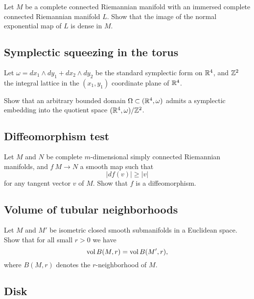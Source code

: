 \begin{pr}
Let $M$ be a complete connected Riemannian manifold
with an immersed complete connected Riemannian manifold $L$.
Show that the image  of the 
normal exponential map of $L$ is dense in $M$.
\end{pr}

\subsection*{Symplectic squeezing in the torus}
\label{Symplectic squeezing in the torus}



\begin{pr}
Let 
$\omega=dx_1\wedge dy_1+ dx_2\wedge dy_2$
be the standard symplectic form on $\mathbb{R}^4$, and $\mathbb{Z}^2$ the integral lattice in the $(x_1,y_1)$ coordinate plane of $\mathbb{R}^4$.

Show that an arbitrary bounded domain $\Omega\subset (\mathbb{R}^4,\omega)$
admits a symplectic embedding into the quotient space $(\mathbb{R}^4,\omega)/\mathbb{Z}^2$. 
\end{pr}

\subsection*{Diffeomorphism test\easy}
\label{Diffeomorphism test}


\begin{pr}
Let $M$ and $N$ be complete $m$-dimensional simply connected Riemannian manifolds, and $f\:M\to N$ a smooth map such that 
$$|df(v)|\ge |v|$$
for any tangent vector $v$ of $M$.
Show that $f$ is a diffeomorphism.
\end{pr}

\subsection*{Volume of tubular neighborhoods\thm}
\label{Volume of tubular neighborhoods}

\begin{pr}
Let $M$ and $M'$ be isometric closed smooth submanifolds in a Euclidean space.
Show that for all small $r>0$ we have
$$\operatorname{\rm vol}\nolimits B(M,r)=\operatorname{\rm vol}\nolimits B(M',r),$$
where $B(M,r)$ denotes the $r$-neighborhood of $M$.
\end{pr}

\subsection*{Disk\hard}
\label{disk}

